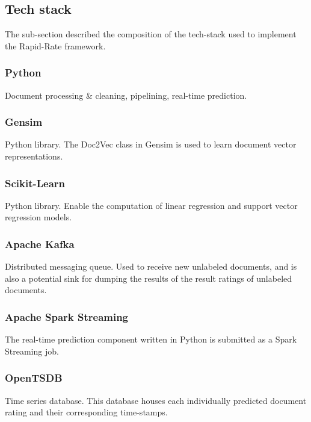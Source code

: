 \documentclass[conference]{IEEEtran}
\begin{document}
    \subsection{Tech stack} \label{Tech stack}
        The sub-section described the composition of the tech-stack used to implement the Rapid-Rate framework.

        \subsubsection{Python}
            Document processing \& cleaning, pipelining, real-time prediction\cite{python}.

        \subsubsection{Gensim} \label{gensim}
            Python library. 
            The Doc2Vec class in Gensim is used to learn document vector representations\cite{doc2vec_api}.
        
        \subsubsection{Scikit-Learn}
            Python library. 
            Enable the computation of linear regression and support vector regression models\cite{scikit_learn}.
        
        \subsubsection{Apache Kafka} \label{kafka}
            Distributed messaging queue. 
            Used to receive new unlabeled documents, and is also a potential sink for dumping the results of the result ratings of unlabeled documents\cite{kreps2011kafka}.
        
        \subsubsection{Apache Spark Streaming} \label{spark}
            The real-time prediction component written in Python is submitted as a Spark Streaming job\cite{zaharia2012discretized}.
        
        \subsubsection{OpenTSDB} \label{opentsdb}
            Time series database. 
            This database houses each individually predicted document rating and their corresponding time-stamps\cite{opentsdb}.
\end{document}
